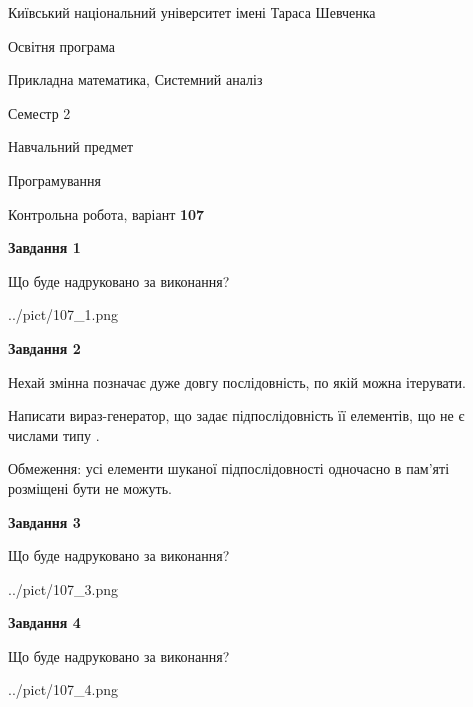 \documentclass[12pt, ukrainian]{article}
\begin{document}
{{\begin {small}\par
{ \center  Київський національний університет імені Тараса Шевченка \par}
{\parbox {5 cm}{Освітня програма \hfill}{\parbox {8 cm}{Прикладна математика, Системний аналіз \hfill}}\parbox {5 cm}{\hfill Семестр 2}}\par
{\parbox {5 cm} {Навчальний предмет \hfill}\parbox {7 cm}{Програмування \hfill}\parbox {6cm}{\hfill}\par}\vspace{-7pt} \end{small}}{\center Контрольна робота, варіант  \No \textbf
{ 107 }\par}}
{
\begin {large}
{\begin {center}\textbf{Завдання 1}\end {center}}\par
Що буде надруковано за виконання?\par\par
\begin{center}
	{../pict/107_1.png}
\end{center}
\newpage

{\begin {center}\textbf{Завдання 2}\end {center}}\par
Нехай змінна  позначає дуже довгу послідовність, по якій можна ітерувати.

Написати вираз-генератор, що задає підпослідовність її елементів, що не є числами типу .

Обмеження: усі елементи шуканої підпослідовності одночасно в пам'яті розміщені бути не можуть.\par
\newpage

{\begin {center}\textbf{Завдання 3}\end {center}}\par
Що буде надруковано за виконання?\par
\begin{center}
	{../pict/107_3.png}
\end{center}
\newpage

{\begin {center}\textbf{Завдання 4}\end {center}}\par
Що буде надруковано за виконання?\par
\begin{center}
	{../pict/107_4.png}
\end{center}
\newpage


\end{large}}
\end{document}
